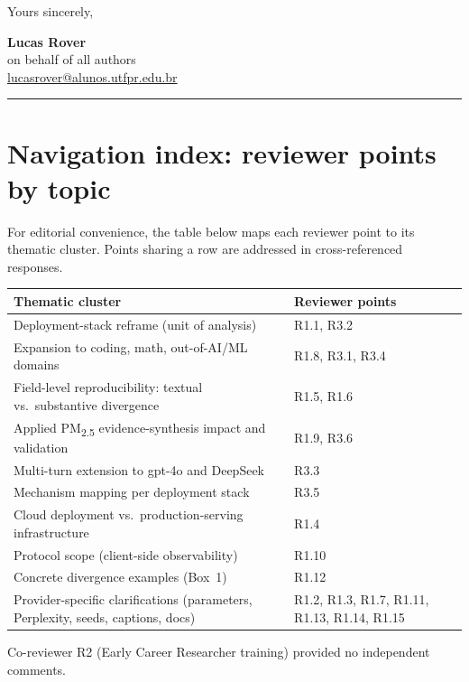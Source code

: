 \documentclass[11pt,a4paper]{article}
\begin{document}
\bigskip

Yours sincerely,

\medskip

\textbf{Lucas Rover} \\
on behalf of all authors \\
\href{mailto:lucasrover@alunos.utfpr.edu.br}{lucasrover@alunos.utfpr.edu.br}

\bigskip
\hrule
\bigskip

\section*{Navigation index: reviewer points by topic}

\noindent For editorial convenience, the table below maps each reviewer point to its thematic cluster. Points sharing a row are addressed in cross-referenced responses.

\begin{center}
\renewcommand{\arraystretch}{1.25}
\begin{tabular}{p{6.5cm}p{8.5cm}}
\hline
\textbf{Thematic cluster} & \textbf{Reviewer points} \\
\hline
Deployment-stack reframe (unit of analysis) & R1.1, R3.2 \\
Expansion to coding, math, out-of-AI/ML domains & R1.8, R3.1, R3.4 \\
Field-level reproducibility: textual vs.\ substantive divergence & R1.5, R1.6 \\
Applied PM\textsubscript{2.5} evidence-synthesis impact and validation & R1.9, R3.6 \\
Multi-turn extension to gpt-4o and DeepSeek & R3.3 \\
Mechanism mapping per deployment stack & R3.5 \\
Cloud deployment vs.\ production-serving infrastructure & R1.4 \\
Protocol scope (client-side observability) & R1.10 \\
Concrete divergence examples (Box~1) & R1.12 \\
Provider-specific clarifications (parameters, Perplexity, seeds, captions, docs) & R1.2, R1.3, R1.7, R1.11, R1.13, R1.14, R1.15 \\
\hline
\end{tabular}
\end{center}

\noindent Co-reviewer R2 (Early Career Researcher training) provided no independent comments.
\end{document}
